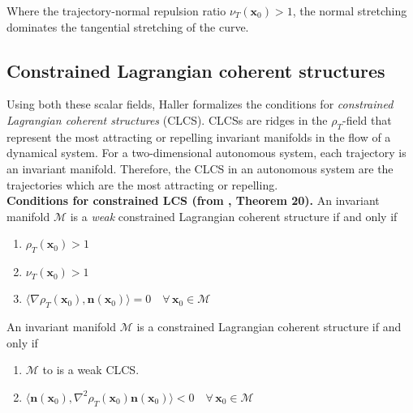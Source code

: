 \documentclass[onecolumn,3p]{elsarticle}
\begin{document}
	Where the trajectory-normal repulsion ratio \(\nu_T(\mathbf{x}_0)>1\), the normal stretching dominates the tangential stretching of the curve.
	
	\subsection{Constrained Lagrangian coherent structures}
	Using both these scalar fields, Haller \cite{haller_variational_2011} formalizes the conditions for {\it constrained Lagrangian coherent structures} (CLCS). CLCSs are ridges in the $\rho_T$-field that represent the most attracting or repelling invariant manifolds in the flow of a dynamical system. For a two-dimensional autonomous system, each trajectory is an invariant manifold. Therefore, the CLCS in an autonomous system are the trajectories which are the most attracting or repelling. \\
	
	\noindent \textbf{Conditions for constrained LCS (from \cite{haller_variational_2011}, Theorem 20).} An invariant manifold $\mathcal{M}$ is a {\it weak} constrained Lagrangian coherent structure if and only if
	\begin{enumerate}[label=1\alph*.]
		\item $\rho_T(\mathbf{x}_0) > 1$
		\item $\nu_T(\mathbf{x}_0) > 1$
		\item $\langle \nabla \rho_T(\mathbf{x}_0), \mathbf{n}(\mathbf{x}_0) \rangle = 0 \quad \forall \, \mathbf{x}_0 \in \mathcal{M}$
	\end{enumerate}
		
	An invariant manifold $\mathcal{M}$ is a constrained Lagrangian coherent structure if and only if
	\begin{enumerate}[label=2\alph*.]
		\item $\mathcal{M}$ to is a weak CLCS.
		\item $\langle \mathbf{n}(\mathbf{x}_0), \nabla^2\rho_T(\mathbf{x}_0)\mathbf{n}(\mathbf{x}_0) \rangle < 0 \quad \forall \, \mathbf{x}_0 \in \mathcal{M}$ \\
	\end{enumerate}
	
\end{document}
